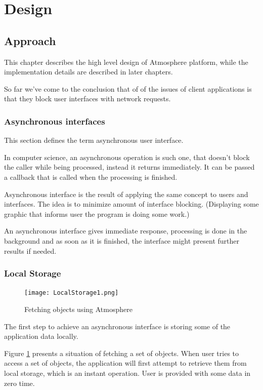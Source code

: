 \section{Design}

\subsection{Approach}

This chapter describes the high level design of Atmosphere platform, while the implementation details are described in later chapters. 

So far we’ve come to the conclusion that of of the issues of client applications is that they block user interfaces with network requests.

\subsubsection{Asynchronous interfaces}

This section defines the term asynchronous user interface. \citep{maccaw_async}

In computer science, an asynchronous operation is such one, that doesn’t block the caller while being processed, instead it returns immediately. It can be passed a callback that is called when the processing is finished.

Asynchronous interface is the result of applying the same concept to users and interfaces. The idea is to minimize amount of interface blocking. (Displaying some graphic that informs user the program is doing some work.)

An asynchronous interface gives immediate response, processing is done in the background and as soon as it is finished, the interface might present further results if needed.

\subsubsection{Local Storage}

\begin{figure}[ht!]
\centering
\texttt{[image: LocalStorage1.png]}
\caption{Fetching objects using Atmosphere \label{fig:1}}
\end{figure}

The first step to achieve an asynchronous interface is storing some of the application data locally.

Figure \ref{fig:1} presents a situation of fetching a set of objects. When user tries to access a set of objects,  the application will first attempt to retrieve them from local storage,  which is an instant operation. User is provided with some data in zero time.


